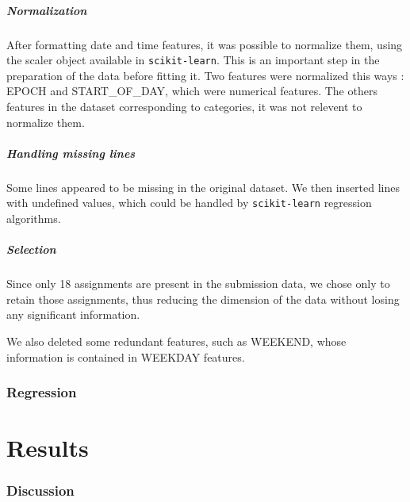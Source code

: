 \documentclass[a4paper,10pt]{article}
\begin{document}
    \subsubsection{Normalization}

    After formatting date and time features, it was possible to normalize them, using the scaler object available in {\tt scikit-learn}. This is an important step in the preparation of the data before fitting it. Two features were normalized this ways : EPOCH and START\_OF\_DAY, which were numerical features. The others features in the dataset corresponding to categories, it was not relevent to normalize them.

    \subsubsection{Handling missing lines}

    Some lines appeared to be missing in the original dataset. We then inserted lines with undefined values, which could be handled by {\tt scikit-learn} regression algorithms.

    \subsubsection{Selection}

    Since only 18 assignments are present in the submission data, we chose only to retain those assignments, thus reducing the dimension of the data without losing any significant information.

    We also deleted some redundant features, such as WEEKEND, whose information is contained in WEEKDAY features.


\section{Regression}

\part{Results}
\section{Discussion}
\end{document}
